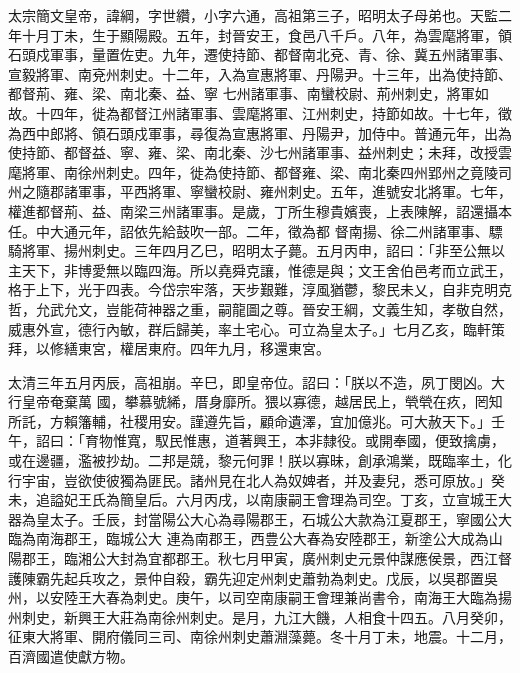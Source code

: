 
\begin{pinyinscope}

 太宗簡文皇帝，諱綱，字世纘，小字六通，高祖第三子，昭明太子母弟也。天監二年十月丁未，生于顯陽殿。五年，封晉安王，食邑八千戶。八年，為雲麾將軍，領石頭戍軍事，量置佐吏。九年，遷使持節、都督南北兗、青、徐、冀五州諸軍事、宣毅將軍、南兗州刺史。十二年，入為宣惠將軍、丹陽尹。十三年，出為使持節、都督荊、雍、梁、南北秦、益、寧
 七州諸軍事、南蠻校尉、荊州刺史，將軍如故。十四年，徙為都督江州諸軍事、雲麾將軍、江州刺史，持節如故。十七年，徵為西中郎將、領石頭戍軍事，尋復為宣惠將軍、丹陽尹，加侍中。普通元年，出為使持節、都督益、寧、雍、梁、南北秦、沙七州諸軍事、益州刺史；未拜，改授雲麾將軍、南徐州刺史。四年，徙為使持節、都督雍、梁、南北秦四州郢州之竟陵司州之隨郡諸軍事，平西將軍、寧蠻校尉、雍州刺史。五年，進號安北將軍。七年，權進都督荊、益、南梁三州諸軍事。是歲，丁所生穆貴嬪喪，上表陳解，詔還攝本任。中大通元年，詔依先給鼓吹一部。二年，徵為都
 督南揚、徐二州諸軍事、驃騎將軍、揚州刺史。三年四月乙巳，昭明太子薨。五月丙申，詔曰：「非至公無以主天下，非博愛無以臨四海。所以堯舜克讓，惟德是與；文王舍伯邑考而立武王，格于上下，光于四表。今岱宗牢落，天步艱難，淳風猶鬱，黎民未乂，自非克明克哲，允武允文，豈能荷神器之重，嗣龍圖之尊。晉安王綱，文義生知，孝敬自然，威惠外宣，德行內敏，群后歸美，率土宅心。可立為皇太子。」七月乙亥，臨軒策拜，以修繕東宮，權居東府。四年九月，移還東宮。



 太清三年五月丙辰，高祖崩。辛巳，即皇帝位。詔曰：「朕以不造，夙丁閔凶。大行皇帝奄棄萬
 國，攀慕號絺，厝身靡所。猥以寡德，越居民上，煢煢在疚，罔知所託，方賴籓輔，社稷用安。謹遵先旨，顧命遺澤，宜加億兆。可大赦天下。」壬午，詔曰：「育物惟寬，馭民惟惠，道著興王，本非隸役。或開奉國，便致擒虜，或在邊疆，濫被抄劫。二邦是競，黎元何罪！朕以寡昧，創承鴻業，既臨率土，化行宇宙，豈欲使彼獨為匪民。諸州見在北人為奴婢者，并及妻兒，悉可原放。」癸未，追謚妃王氏為簡皇后。六月丙戌，以南康嗣王會理為司空。丁亥，立宣城王大器為皇太子。壬辰，封當陽公大心為尋陽郡王，石城公大款為江夏郡王，寧國公大臨為南海郡王，臨城公大
 連為南郡王，西豊公大春為安陸郡王，新塗公大成為山陽郡王，臨湘公大封為宜都郡王。秋七月甲寅，廣州刺史元景仲謀應侯景，西江督護陳霸先起兵攻之，景仲自殺，霸先迎定州刺史蕭勃為刺史。戊辰，以吳郡置吳州，以安陸王大春為刺史。庚午，以司空南康嗣王會理兼尚書令，南海王大臨為揚州刺史，新興王大莊為南徐州刺史。是月，九江大饑，人相食十四五。八月癸卯，征東大將軍、開府儀同三司、南徐州刺史蕭淵藻薨。冬十月丁未，地震。十二月，百濟國遣使獻方物。




\end{pinyinscope}

